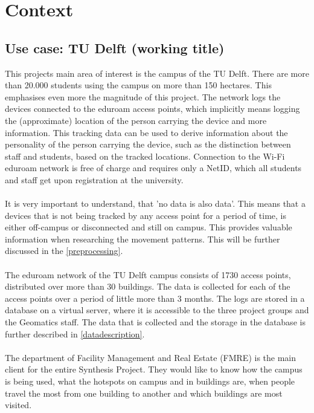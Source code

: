 \chapter{Context}
\section{Use case: TU Delft (working title)}
This projects main area of interest is the campus of the TU Delft. There are more than 20.000 students using the campus on more than 150 hectares. This emphasises even more the magnitude of this project. The network logs the devices connected to the eduroam access points, which implicitly means logging the (approximate) location of the person carrying the device and more information. This tracking data can be used to derive information about the personality of the person carrying the device, such as the distinction between staff and students, based on the tracked locations. Connection to the Wi-Fi eduroam network is free of charge and requires only a NetID, which all students and staff get upon registration at the university. \\\\
It is very important to understand, that 'no data is also data'. This means that a devices that is not being tracked by any access point for a period of time, is either off-campus or disconnected and still on campus. This provides valuable information when researching the movement patterns. This will be further discussed in the \autoref{preprocessing}. \\\\
The eduroam network of the TU Delft campus consists of 1730 access points, distributed over more than 30 buildings. The data is collected for each of the access points over a period of little more than 3 months. The logs are stored in a database on a virtual server, where it is accessible to the three project groups and the Geomatics staff. The data that is collected and the storage in the database is further described in \autoref{datadescription}. \\\\
The department of Facility Management and Real Estate (FMRE) is the main client for the entire Synthesis Project. They would like to know how the campus is being used, what the hotspots on campus and in buildings are, when people travel the most from one building to another and which buildings are most visited.

